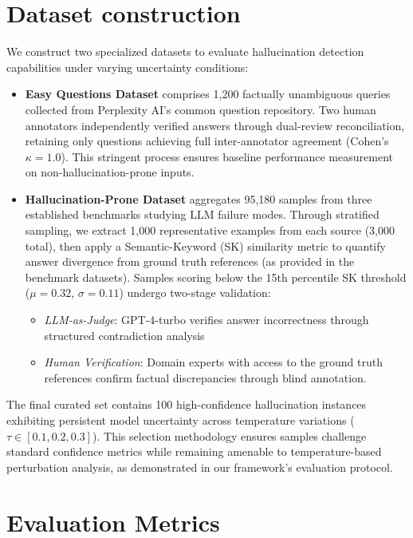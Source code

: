 \documentclass[sigconf]{acmart}
\begin{document}
\section{Dataset construction}

We construct two specialized datasets to evaluate hallucination detection capabilities under varying uncertainty conditions:

\begin{itemize}
    \item \textbf{Easy Questions Dataset} comprises 1,200 factually unambiguous queries collected from Perplexity AI's common question repository. Two human annotators independently verified answers through dual-review reconciliation, retaining only questions achieving full inter-annotator agreement (Cohen's $\kappa = 1.0$). This stringent process ensures baseline performance measurement on non-hallucination-prone inputs.

    \item \textbf{Hallucination-Prone Dataset} aggregates 95,180 samples from three established benchmarks \cite{defan_dataset,ignorance_vs_error,halueval} studying LLM failure modes. Through stratified sampling, we extract 1,000 representative examples from each source (3,000 total), then apply a Semantic-Keyword (SK) similarity metric to quantify answer divergence from ground truth references (as provided in the benchmark datasets). Samples scoring below the 15th percentile SK threshold ($\mu = 0.32$, $\sigma = 0.11$) undergo two-stage validation:
    \begin{itemize}
        \item \textit{LLM-as-Judge}: GPT-4-turbo verifies answer incorrectness through structured contradiction analysis
        \item \textit{Human Verification}: Domain experts with access to the ground truth references confirm factual discrepancies through blind annotation.
    \end{itemize}
\end{itemize}

The final curated set contains 100 high-confidence hallucination instances exhibiting persistent model uncertainty across temperature variations ($\tau \in [0.1, 0.2, 0.3]$). This selection methodology ensures samples challenge standard confidence metrics while remaining amenable to temperature-based perturbation analysis, as demonstrated in our framework's evaluation protocol.

\section{Evaluation Metrics}
\end{document}
